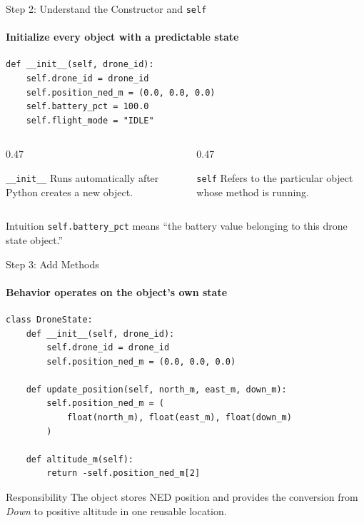\begin{frame}[fragile]{Step 2: Understand the Constructor and \texttt{self}}
\framesubtitle{Initialize every object with a predictable state}

\begin{verbatim}
def __init__(self, drone_id):
    self.drone_id = drone_id
    self.position_ned_m = (0.0, 0.0, 0.0)
    self.battery_pct = 100.0
    self.flight_mode = "IDLE"
\end{verbatim}

\begin{columns}[T,onlytextwidth]
    \begin{column}{0.47\textwidth}
        \begin{block}{\texttt{\_\_init\_\_}}
            Runs automatically after Python creates a new object.
        \end{block}
    \end{column}
    \hfill
    \begin{column}{0.47\textwidth}
        \begin{block}{\texttt{self}}
            Refers to the particular object whose method is running.
        \end{block}
    \end{column}
\end{columns}

\begin{exampleblock}{Intuition}
    \texttt{self.battery\_pct} means ``the battery value belonging to this drone
    state object.''
\end{exampleblock}
\end{frame}


\begin{frame}[fragile]{Step 3: Add Methods}
\framesubtitle{Behavior operates on the object's own state}

\begin{verbatim}
class DroneState:
    def __init__(self, drone_id):
        self.drone_id = drone_id
        self.position_ned_m = (0.0, 0.0, 0.0)

    def update_position(self, north_m, east_m, down_m):
        self.position_ned_m = (
            float(north_m), float(east_m), float(down_m)
        )

    def altitude_m(self):
        return -self.position_ned_m[2]
\end{verbatim}

\begin{exampleblock}{Responsibility}
    The object stores NED position and provides the conversion from
    \textit{Down} to positive altitude in one reusable location.
\end{exampleblock}
\end{frame}


